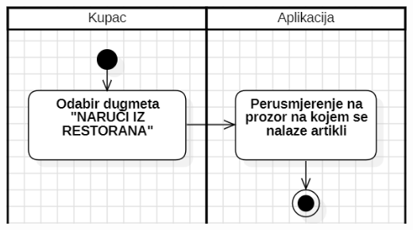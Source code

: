 \documentclass{scrreprt}
\begin{document}
\begin{center}
	\includegraphics[width=14cm]{./img/17.png}
\end{center}

\pagebreak
\end{document}
